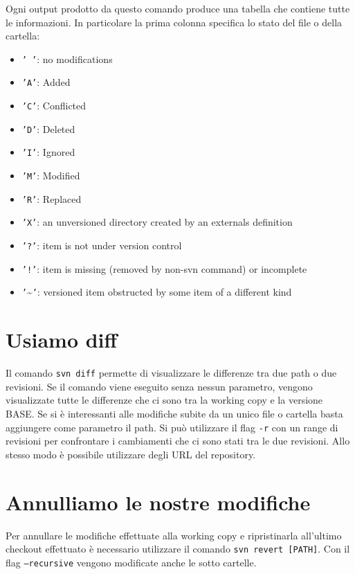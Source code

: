 Ogni output prodotto da questo comando produce una tabella che contiene tutte le informazioni. In particolare la prima colonna specifica lo stato del file o della cartella:
\begin{itemize}
\item \texttt{' '}: no modifications
\item \texttt{'A'}: Added
\item \texttt{'C'}: Conflicted
\item \texttt{'D'}: Deleted
\item \texttt{'I'}: Ignored
\item \texttt{'M'}: Modified
\item \texttt{'R'}: Replaced
\item \texttt{'X'}: an unversioned directory created by an externals definition
\item \texttt{'?'}: item is not under version control
\item \texttt{'!'}: item is missing (removed by non-svn command) or incomplete
\item \texttt{'}\textasciitilde\texttt{'}: versioned item obstructed by some item of a different kind
\end{itemize}

\section{Usiamo diff}

Il comando \texttt{svn diff} permette di visualizzare le differenze tra due path o due revisioni.
Se il comando viene eseguito senza nessun parametro, vengono visualizzate tutte le differenze che ci sono tra la working copy e la versione BASE. Se si è interessanti alle modifiche subite da un unico file o cartella basta aggiungere come parametro il path. Si può utilizzare il flag \texttt{-r} con un range di revisioni per confrontare i cambiamenti che ci sono stati tra le due revisioni.
Allo stesso modo è possibile utilizzare degli URL del repository.

\section{Annulliamo le nostre modifiche}

Per annullare le modifiche effettuate alla working copy e ripristinarla all'ultimo checkout effettuato è necessario utilizzare il comando \texttt{svn revert [PATH]}. Con il flag \texttt{--recursive} vengono modificate anche le sotto cartelle.

